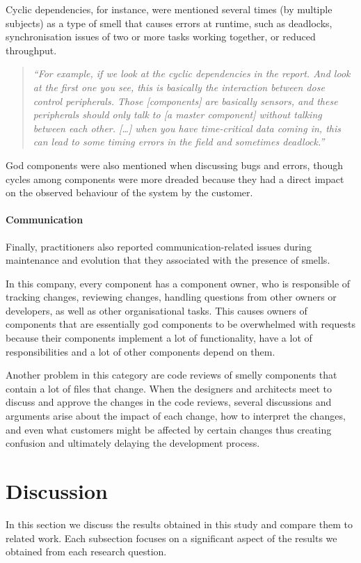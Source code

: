 Cyclic dependencies, for instance, were mentioned several times (by multiple subjects) as a type of smell that causes errors at runtime, such as deadlocks, synchronisation issues of two or more tasks working together, or reduced throughput.
\begin{quote}
    \emph{``For example, if we look at the cyclic dependencies in the report. And look at the first one you see, this is basically the interaction between dose control peripherals. Those [components] are basically sensors, and these peripherals should only talk to [a master component] without talking between each other. […] when you have time-critical data coming in, this can lead to some timing errors in the field and sometimes deadlock.''}
\end{quote}

God components were also mentioned when discussing bugs and errors, though cycles among components were more dreaded because they had a direct impact on the observed behaviour of the system by the customer.


\paragraph{Communication}
Finally, practitioners also reported communication-related issues during maintenance and evolution that they associated with the presence of smells.

In this company, every component has a component owner, who is responsible of tracking changes, reviewing changes, handling questions from other owners or developers, as well as other organisational tasks.
This causes owners of components that are essentially god components to be overwhelmed with requests because their components implement a lot of functionality, have a lot of responsibilities and a lot of other components depend on them. 

Another problem in this category are code reviews of smelly components that contain a lot of files that change.
When the designers and architects meet to discuss and approve the changes in the code reviews, several discussions and arguments arise about the impact of each change, how to interpret the changes, and even what customers might be affected by certain changes thus creating confusion and ultimately delaying the development process.


\section{Discussion}\label{c4:sec:discussion}
In this section we discuss the results obtained in this study and compare them to related work. Each subsection focuses on a significant aspect of the results we obtained from each research question. 

